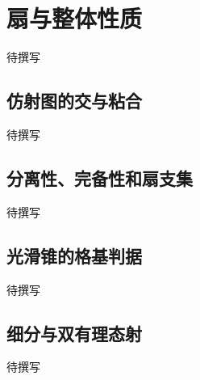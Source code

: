 
% 
% 

\section{扇与整体性质}
\label{g5:sec:2802}

待撰写

\subsection{仿射图的交与粘合}
\label{g5:subsec:2802:01}
待撰写

\subsection{分离性、完备性和扇支集}
\label{g5:subsec:2802:02}
待撰写

\subsection{光滑锥的格基判据}
\label{g5:subsec:2802:03}
待撰写

\subsection{细分与双有理态射}
\label{g5:subsec:2802:04}
待撰写
